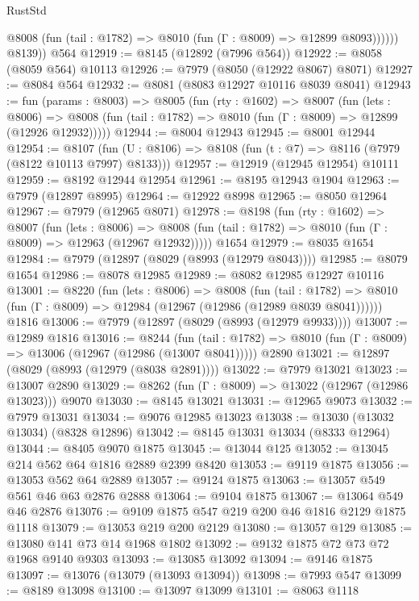 \begin{lexlean}{RustStd}
\begin{coremodule}
              @8008 (fun (tail : @1782) => @8010 (fun (Γ : @8009) => @12899 @8093))))))
        @8139))
    @564
@12919 := @8145 (@12892 (@7996 @564))
@12922 := @8058 (@8059 @564) @10113
@12926 := @7979 (@8050 (@12922 @8067) @8071)
@12927 := @8084 @564
@12932 := @8081 (@8083 @12927 @10116 @8039 @8041)
@12943 := fun (params : @8003) =>
  @8005
    (fun (rty : @1602) =>
    @8007
      (fun (lets : @8006) =>
      @8008 (fun (tail : @1782) => @8010 (fun (Γ : @8009) => @12899 (@12926 @12932)))))
@12944 := @8004 @12943
@12945 := @8001 @12944
@12954 := @8107
    (fun (U : @8106) => @8108 (fun (t : @7) => @8116 (@7979 (@8122 @10113 @7997) @8133)))
@12957 := @12919 (@12945 @12954) @10111
@12959 := @8192 @12944 @12954
@12961 := @8195 @12943 @1904
@12963 := @7979 (@12897 @8995)
@12964 := @12922 @8998
@12965 := @8050 @12964
@12967 := @7979 (@12965 @8071)
@12978 := @8198
    (fun (rty : @1602) =>
    @8007
      (fun (lets : @8006) =>
      @8008 (fun (tail : @1782) => @8010 (fun (Γ : @8009) => @12963 (@12967 @12932)))))
    @1654
@12979 := @8035 @1654
@12984 := @7979 (@12897 (@8029 (@8993 (@12979 @8043))))
@12985 := @8079 @1654
@12986 := @8078 @12985
@12989 := @8082 @12985 @12927 @10116
@13001 := @8220
    (fun (lets : @8006) =>
    @8008
      (fun (tail : @1782) =>
      @8010 (fun (Γ : @8009) => @12984 (@12967 (@12986 (@12989 @8039 @8041))))))
    @1816
@13006 := @7979 (@12897 (@8029 (@8993 (@12979 @9933))))
@13007 := @12989 @1816
@13016 := @8244
    (fun (tail : @1782) => @8010 (fun (Γ : @8009) => @13006 (@12967 (@12986 (@13007 @8041)))))
    @2890
@13021 := @12897 (@8029 (@8993 (@12979 (@8038 @2891))))
@13022 := @7979 @13021
@13023 := @13007 @2890
@13029 := @8262 (fun (Γ : @8009) => @13022 (@12967 (@12986 @13023))) @9070
@13030 := @8145 @13021
@13031 := @12965 @9073
@13032 := @7979 @13031
@13034 := @9076 @12985 @13023
@13038 := @13030 (@13032 @13034) (@8328 @12896)
@13042 := @8145 @13031 @13034 (@8333 @12964)
@13044 := @8405 @9070 @1875
@13045 := @13044 @125
@13052 := @13045 @214 @562 @64 @1816 @2889 @2399 @8420
@13053 := @9119 @1875
@13056 := @13053 @562 @64 @2889
@13057 := @9124 @1875
@13063 := @13057 @549 @561 @46 @63 @2876 @2888
@13064 := @9104 @1875
@13067 := @13064 @549 @46 @2876
@13076 := @9109 @1875 @547 @219 @200 @46 @1816 @2129 @1875 @1118
@13079 := @13053 @219 @200 @2129
@13080 := @13057 @129
@13085 := @13080 @141 @73 @14 @1968 @1802
@13092 := @9132 @1875 @72 @73 @72 @1968 @9140 @9303
@13093 := @13085 @13092
@13094 := @9146 @1875
@13097 := @13076 (@13079 (@13093 @13094))
@13098 := @7993 @547
@13099 := @8189 @13098
@13100 := @13097 @13099
@13101 := @8063 @1118

\end{coremodule}
\end{lexlean}
